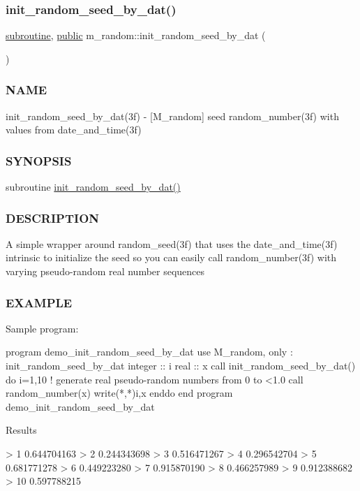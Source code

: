 \subsubsection{\texorpdfstring{init\+\_\+random\+\_\+seed\+\_\+by\+\_\+dat()}{init\_random\_seed\_by\_dat()}}
{\footnotesize\ttfamily \hyperlink{M__stopwatch_83_8txt_acfbcff50169d691ff02d4a123ed70482}{subroutine}, \hyperlink{M__stopwatch_83_8txt_a2f74811300c361e53b430611a7d1769f}{public} m\+\_\+random\+::init\+\_\+random\+\_\+seed\+\_\+by\+\_\+dat (\begin{DoxyParamCaption}{ }\end{DoxyParamCaption})}



\subsubsection*{N\+A\+ME}

init\+\_\+random\+\_\+seed\+\_\+by\+\_\+dat(3f) -\/ \mbox{[}M\+\_\+random\mbox{]} seed random\+\_\+number(3f) with values from date\+\_\+and\+\_\+time(3f) \subsubsection*{S\+Y\+N\+O\+P\+S\+IS}

subroutine \hyperlink{namespacem__random_a6e3975f994c77778043f3e5d00614317}{init\+\_\+random\+\_\+seed\+\_\+by\+\_\+dat()} \subsubsection*{D\+E\+S\+C\+R\+I\+P\+T\+I\+ON}

A simple wrapper around random\+\_\+seed(3f) that uses the date\+\_\+and\+\_\+time(3f) intrinsic to initialize the seed so you can easily call random\+\_\+number(3f) with varying pseudo-\/random real number sequences \subsubsection*{E\+X\+A\+M\+P\+LE}

\begin{DoxyVerb}Sample program:

 program demo_init_random_seed_by_dat
 use M_random, only : init_random_seed_by_dat
 integer :: i
 real    :: x
    call init_random_seed_by_dat()
    do i=1,10
       ! generate real pseudo-random numbers from 0 to <1.0
       call random_number(x)
       write(*,*)i,x
    enddo
 end program demo_init_random_seed_by_dat

Results

  >     1  0.644704163
  >     2  0.244343698
  >     3  0.516471267
  >     4  0.296542704
  >     5  0.681771278
  >     6  0.449223280
  >     7  0.915870190
  >     8  0.466257989
  >     9  0.912388682
  >    10  0.597788215 \end{DoxyVerb}
 

